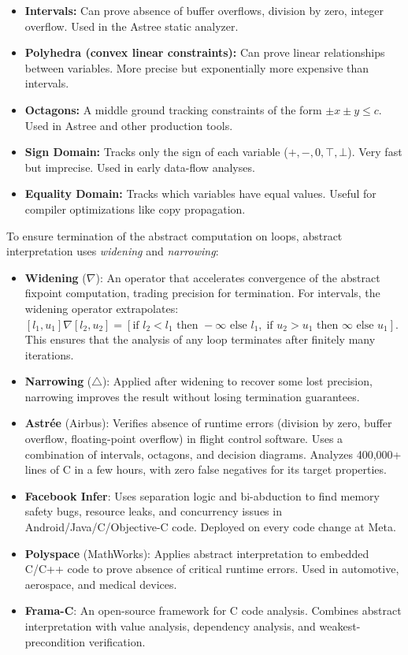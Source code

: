 \begin{itemize}
\item \textbf{Intervals:} Can prove absence of buffer overflows, division by zero, integer overflow. Used in the Astree static analyzer.
\item \textbf{Polyhedra (convex linear constraints):} Can prove linear relationships between variables. More precise but exponentially more expensive than intervals.
\item \textbf{Octagons:} A middle ground tracking constraints of the form $\pm x \pm y \leq c$. Used in Astree and other production tools.
\item \textbf{Sign Domain:} Tracks only the sign of each variable ($+, -, 0, \top, \bot$). Very fast but imprecise. Used in early data-flow analyses.
\item \textbf{Equality Domain:} Tracks which variables have equal values. Useful for compiler optimizations like copy propagation.
\end{itemize}

To ensure termination of the abstract computation on loops, abstract interpretation uses \emph{widening} and \emph{narrowing}:
\begin{itemize}
\item \textbf{Widening} ($\nabla$): An operator that accelerates convergence of the abstract fixpoint computation, trading precision for termination. For intervals, the widening operator extrapolates: $[l_1, u_1] \nabla [l_2, u_2] = [\text{if } l_2 < l_1 \text{ then } -\infty \text{ else } l_1,\; \text{if } u_2 > u_1 \text{ then } \infty \text{ else } u_1]$. This ensures that the analysis of any loop terminates after finitely many iterations.
\item \textbf{Narrowing} ($\triangle$): Applied after widening to recover some lost precision, narrowing improves the result without losing termination guarantees.
\end{itemize}

\begin{itemize}
\item \textbf{Astr\'ee} (Airbus): Verifies absence of runtime errors (division by zero, buffer overflow, floating-point overflow) in flight control software. Uses a combination of intervals, octagons, and decision diagrams. Analyzes 400,000+ lines of C in a few hours, with zero false negatives for its target properties.
\item \textbf{Facebook Infer}: Uses separation logic and bi-abduction to find memory safety bugs, resource leaks, and concurrency issues in Android/Java/C/Objective-C code. Deployed on every code change at Meta.
\item \textbf{Polyspace} (MathWorks): Applies abstract interpretation to embedded C/C++ code to prove absence of critical runtime errors. Used in automotive, aerospace, and medical devices.
\item \textbf{Frama-C}: An open-source framework for C code analysis. Combines abstract interpretation with value analysis, dependency analysis, and weakest-precondition verification.
\end{itemize}


